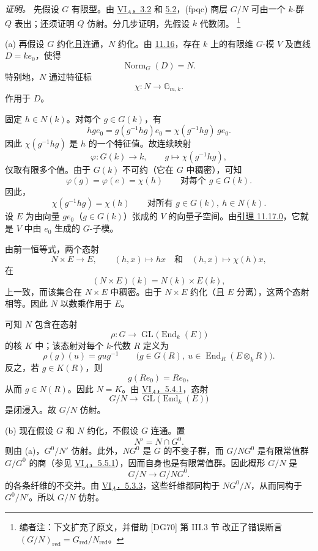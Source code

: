 \emph{证明。}
先假设 \(G\) 有限型。由 \hyperref[thm:sga3-VIA-3.2]{VI\(_A\)，3.2} 和 \hyperref[par:sga3-VIA-5.2]{5.2}，\textup{(fpqc)} 商层 \(G/N\) 可由一个 \(k\)-群 \(Q\) 表出；还须证明 \(Q\) 仿射。分几步证明，先假设 \(k\) 代数闭。%
\footnote{\label{note:sga3-VIB-132}编者注：下文扩充了原文，并借助 \textup{[DG70]} 第 III.3 节  改正了错误断言 \((G/N)_{\mathrm{red}}=G_{\mathrm{red}}/N_{\mathrm{red}}\)。}

\smallskip
{}\label{case:sga3-VIB-11.17-a}%
\noindent\textup{(a)}
再假设 \(G\) 约化且连通，\(N\) 约化。由 \hyperref[thm:sga3-VIB-11.16]{11.16}，存在 \(k\) 上的有限维 \(G\)-模 \(V\) 及直线 \(D=ke_0\)，使得
\[
  \operatorname{Norm}_G(D)=N.
\]
特别地，\(N\) 通过特征标
\[
  \chi:N\longrightarrow\mathbb G_{m,k}.
\]
作用于 \(D\)。

固定 \(h\in N(k)\)。对每个 \(g\in G(k)\)，有
\[
  hge_0=g(g^{-1}hg)e_0
       =\chi(g^{-1}hg)\,ge_0.
\]
因此 \(\chi(g^{-1}hg)\) 是 \(h\) 的一个特征值。故连续映射
\[
  \varphi:G(k)\longrightarrow k,\qquad
  g\longmapsto\chi(g^{-1}hg),
\]
仅取有限多个值。由于 \(G(k)\) 不可约\textup{（它在 \(G\) 中稠密）}，可知
\[
  \varphi(g)=\varphi(e)=\chi(h)
  \qquad\text{对每个 }g\in G(k).
\]
因此，
\label{form:sga3-VIB-11.17-character-invariance}%
\[
  \chi(g^{-1}hg)=\chi(h)
  \qquad
  \text{对所有 }g\in G(k),\ h\in N(k).
\]
设 \(E\) 为由向量 \(ge_0\)（\(g\in G(k)\)）张成的 \(V\) 的向量子空间。由\hyperref[lem:sga3-VIB-11.17.0]{引理 11.17.0}，它就是 \(V\) 中由 \(e_0\) 生成的 \(G\)-子模。

由前一恒等式，两个态射
\[
  N\times E\longrightarrow E,\qquad
  (h,x)\longmapsto hx
  \quad\text{和}\quad
  (h,x)\longmapsto\chi(h)x,
\]
在
\[
  (N\times E)(k)=N(k)\times E(k),
\]
上一致，而该集合在 \(N\times E\) 中稠密。由于 \(N\times E\) 约化\textup{（且 \(E\) 分离）}，这两个态射相等。因此 \(N\) 以数乘作用于 \(E\)。

可知 \(N\) 包含在态射
\[
  \rho:G\longrightarrow
    \operatorname{GL}\bigl(\operatorname{End}_k(E)\bigr)
\]
的核 \(K\) 中；该态射对每个 \(k\)-代数 \(R\) 定义为
\[
  \rho(g)(u)=gug^{-1}
  \qquad
  \bigl(g\in G(R),\
  u\in\operatorname{End}_R(E\otimes_kR)\bigr).
\]
反之，若 \(g\in K(R)\)，则
\[
  g(Re_0)=Re_0,
\]
从而 \(g\in N(R)\)。因此 \(N=K\)。由 \hyperref[prop:sga3-VIA-5.4.1]{VI\(_A\)，5.4.1}，态射
\[
  G/N\longrightarrow
  \operatorname{GL}\bigl(\operatorname{End}_k(E)\bigr)
\]
是闭浸入。故 \(G/N\) 仿射。

\smallskip
{}\label{case:sga3-VIB-11.17-b}%
\noindent\textup{(b)}
现在假设 \(G\) 和 \(N\) 约化，不假设 \(G\) 连通。置
\[
  N'=N\cap G^0.
\]
则由 \textup{(a)}，\(G^0/N'\) 仿射。此外，\(NG^0\) 是 \(G\) 的不变子群，而 \(G/NG^0\) 是有限常值群 \(G/G^0\) 的商\textup{（参见 \hyperref[prop:sga3-VIA-5.5.1]{VI\(_A\)，5.5.1}）}，因而自身也是有限常值群。因此概形 \(G/N\) 是
\[
  G/N\longrightarrow G/NG^0.
\]
的各条纤维的不交并。由 \hyperref[par:sga3-VIA-5.3.3]{VI\(_A\)，5.3.3}，这些纤维都同构于 \(NG^0/N\)，从而同构于 \(G^0/N'\)。所以 \(G/N\) 仿射。

